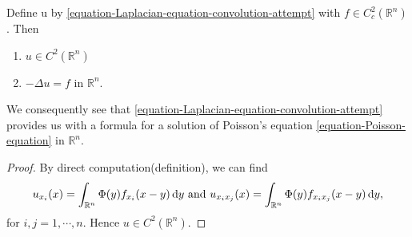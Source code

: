 \begin{theorem}
  \label{theorem-solving-Possion-equation}
  Define u by \eqref{equation-Laplacian-equation-convolution-attempt} with \( f \in C^2_c(\mathbb{R}^n) \).
  Then
  \begin{enumerate}
    \item \( u \in C^2 (\mathbb{R}^n) \)
    \item \( - \Delta u = f \) in \( \mathbb{R}^n \).
  \end{enumerate}
  We consequently see that \eqref{equation-Laplacian-equation-convolution-attempt} provides us with a formula for a solution of Poisson's equation \eqref{equation-Poisson-equation} in \( \mathbb{R}^n \).
\end{theorem}
\begin{proof}
  By direct computation(definition), we can find
  \[
    u_{x_i}(x) = \int_{\mathbb{R}^n} \Phi(y) f_{x_i} (x - y) \mathop{}\!\mathrm{d} y \text{ and } u_{x_i x_j}(x) = \int_{\mathbb{R}^n} \Phi(y) f_{x_i x_j}(x - y) \mathop{}\!\mathrm{d} y,
  \]
  for \( i, j = 1, \cdots, n \).
  Hence \( u \in C^2(\mathbb{R}^n) \).


\end{proof}

